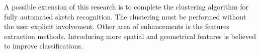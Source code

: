 \documentclass{article}%
\begin{document}
A possible extension of this research is to complete the clustering algorithm for fully automated sketch recognition. The clustering must be performed without the user explicit involvement. Other area of enhancements is the features extraction methods. Introducing more spatial and geometrical features is believed to improve classifications.  %
 



%


\end{document}
